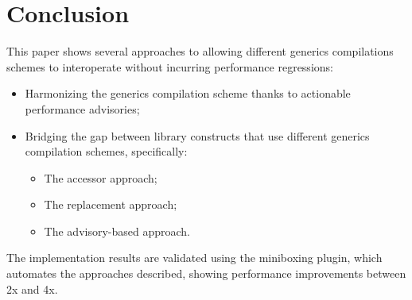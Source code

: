 

\section{Conclusion}



This paper shows several approaches to allowing different generics compilations schemes to interoperate without incurring performance regressions:

\begin{itemize}
\item Harmonizing the generics compilation scheme thanks to actionable performance advisories;
\item Bridging the gap between library constructs that use different generics compilation schemes, specifically:
  \begin{itemize}
    \item The accessor approach;
    \item The replacement approach;
    \item The advisory-based approach.
  \end{itemize}
\end{itemize}

The implementation results are validated using the miniboxing plugin, which automates the approaches described, showing performance improvements between 2x and 4x.


